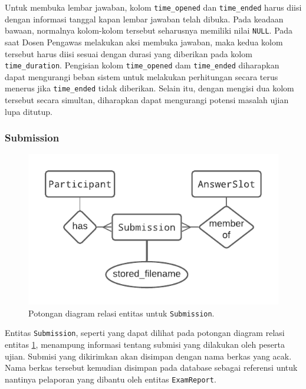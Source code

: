     Untuk membuka lembar jawaban, kolom \texttt{time\_opened} dan
    \texttt{time\_ended} harus diisi dengan informasi tanggal kapan lembar
    jawaban telah dibuka. Pada keadaan bawaan, normalnya kolom-kolom tersebut
    seharusnya memiliki nilai \texttt{NULL}. Pada saat Dosen Pengawas melakukan
    aksi membuka jawaban, maka kedua kolom tersebut harus diisi sesuai dengan
    durasi yang diberikan pada kolom \texttt{time\_duration}. Pengisian kolom
    \texttt{time\_opened} dam \texttt{time\_ended} diharapkan dapat mengurangi
    beban sistem untuk melakukan perhitungan secara terus menerus jika
    \texttt{time\_ended} tidak diberikan. Selain itu, dengan mengisi dua kolom
    tersebut secara simultan, diharapkan dapat mengurangi potensi masalah ujian
    lupa ditutup.
    
\subsubsection{Submission}
    
    \begin{figure}[H]
        \centering
        \includegraphics{Gambar/erd-details/ERD--New - Submission.pdf}
        \caption{Potongan diagram relasi entitas untuk \texttt{Submission}.}
        \label{fig:erd_submission}
    \end{figure}

    Entitas \texttt{Submission}, seperti yang dapat dilihat pada potongan
    diagram relasi entitas \ref{fig:erd_submission}, menampung informasi tentang
    submisi yang dilakukan oleh peserta ujian. Submisi yang dikirimkan akan
    disimpan dengan nama berkas yang acak. Nama berkas tersebut kemudian
    disimpan pada database sebagai referensi untuk nantinya pelaporan yang
    dibantu oleh entitas \texttt{ExamReport}.
    
